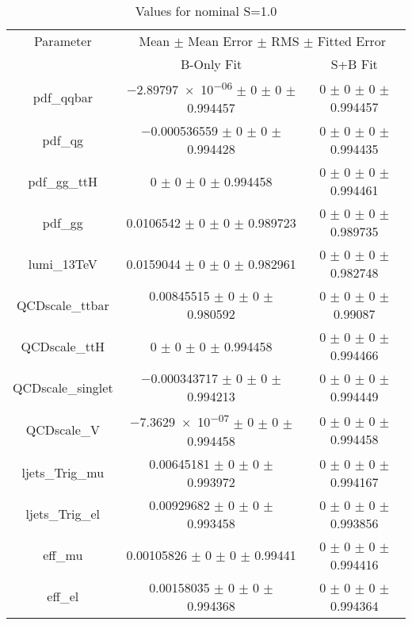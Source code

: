 \begin{table}
\centering
\caption{Values for nominal S=1.0}
\begin{tabular}{ccc}
\toprule
Parameter 	& \multicolumn{2}{c}{Mean $\pm$ Mean Error $\pm$ RMS $\pm$ Fitted Error}\\
 	& B-Only Fit & S+B Fit\\
\midrule
pdf\_qqbar 	& \num{-2.89797e-06} $\pm$ \num{0} $\pm$ \num{0} $\pm$ \num{0.994457} 	& \num{0} $\pm$ \num{0} $\pm$ \num{0} $\pm$ \num{0.994457}\\
pdf\_qg 	& \num{-0.000536559} $\pm$ \num{0} $\pm$ \num{0} $\pm$ \num{0.994428} 	& \num{0} $\pm$ \num{0} $\pm$ \num{0} $\pm$ \num{0.994435}\\
pdf\_gg\_ttH 	& \num{0} $\pm$ \num{0} $\pm$ \num{0} $\pm$ \num{0.994458} 	& \num{0} $\pm$ \num{0} $\pm$ \num{0} $\pm$ \num{0.994461}\\
pdf\_gg 	& \num{0.0106542} $\pm$ \num{0} $\pm$ \num{0} $\pm$ \num{0.989723} 	& \num{0} $\pm$ \num{0} $\pm$ \num{0} $\pm$ \num{0.989735}\\
lumi\_13TeV 	& \num{0.0159044} $\pm$ \num{0} $\pm$ \num{0} $\pm$ \num{0.982961} 	& \num{0} $\pm$ \num{0} $\pm$ \num{0} $\pm$ \num{0.982748}\\
QCDscale\_ttbar 	& \num{0.00845515} $\pm$ \num{0} $\pm$ \num{0} $\pm$ \num{0.980592} 	& \num{0} $\pm$ \num{0} $\pm$ \num{0} $\pm$ \num{0.99087}\\
QCDscale\_ttH 	& \num{0} $\pm$ \num{0} $\pm$ \num{0} $\pm$ \num{0.994458} 	& \num{0} $\pm$ \num{0} $\pm$ \num{0} $\pm$ \num{0.994466}\\
QCDscale\_singlet 	& \num{-0.000343717} $\pm$ \num{0} $\pm$ \num{0} $\pm$ \num{0.994213} 	& \num{0} $\pm$ \num{0} $\pm$ \num{0} $\pm$ \num{0.994449}\\
QCDscale\_V 	& \num{-7.3629e-07} $\pm$ \num{0} $\pm$ \num{0} $\pm$ \num{0.994458} 	& \num{0} $\pm$ \num{0} $\pm$ \num{0} $\pm$ \num{0.994458}\\
ljets\_Trig\_mu 	& \num{0.00645181} $\pm$ \num{0} $\pm$ \num{0} $\pm$ \num{0.993972} 	& \num{0} $\pm$ \num{0} $\pm$ \num{0} $\pm$ \num{0.994167}\\
ljets\_Trig\_el 	& \num{0.00929682} $\pm$ \num{0} $\pm$ \num{0} $\pm$ \num{0.993458} 	& \num{0} $\pm$ \num{0} $\pm$ \num{0} $\pm$ \num{0.993856}\\
eff\_mu 	& \num{0.00105826} $\pm$ \num{0} $\pm$ \num{0} $\pm$ \num{0.99441} 	& \num{0} $\pm$ \num{0} $\pm$ \num{0} $\pm$ \num{0.994416}\\
eff\_el 	& \num{0.00158035} $\pm$ \num{0} $\pm$ \num{0} $\pm$ \num{0.994368} 	& \num{0} $\pm$ \num{0} $\pm$ \num{0} $\pm$ \num{0.994364}\\

\end{tabular}
\end{table}
